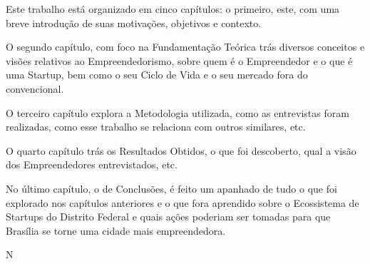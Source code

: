 Este trabalho está organizado em cinco capítulos: o primeiro, este, com uma breve introdução de suas motivações, objetivos e contexto. 

O segundo capítulo, com foco na Fundamentação Teórica trás diversos conceitos e visões relativos ao Empreendedorismo, sobre quem é o Empreendedor e o que é uma Startup, bem como o seu Ciclo de Vida e o seu mercado fora do convencional. 

O terceiro capítulo explora a Metodologia utilizada, como as entrevistas foram realizadas, como esse trabalho se relaciona com outros similares, etc. 

O quarto capítulo trás os Resultados Obtidos, o que foi descoberto, qual a visão dos Empreendedores entrevistados, etc.

No último capítulo, o de Conclusões, é feito um apanhado de tudo o que foi explorado nos capítulos anteriores e o que fora aprendido sobre o Ecossistema de Startups do Distrito Federal e quais ações poderiam ser tomadas para que Brasília se torne uma cidade mais empreendedora.

N